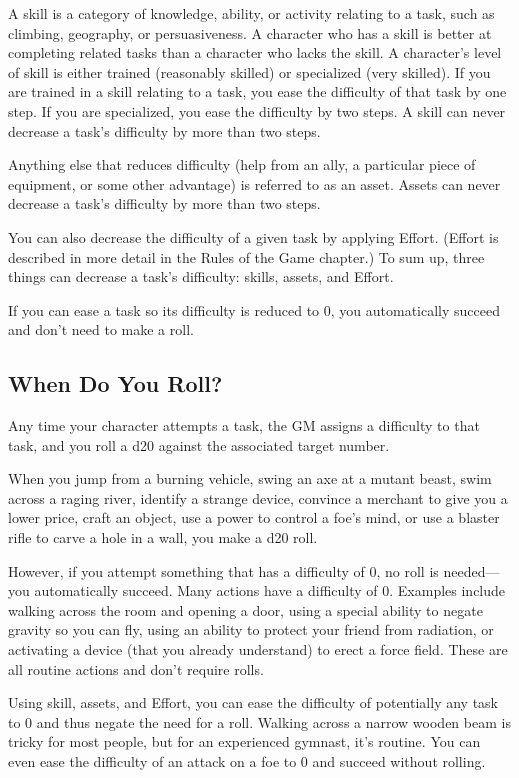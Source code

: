 \begin{multicols}{2}
A skill is a category of knowledge, ability, or activity relating to a task, such as climbing, geography, or persuasiveness. A character who has a skill is better at completing related tasks than a character who lacks the skill. A character’s level of skill is either trained (reasonably skilled) or specialized (very skilled).
If you are trained in a skill relating to a task, you ease the difficulty of that task by one step. If you are specialized, you ease the difficulty by two steps. A skill can never decrease a task’s difficulty by more than two steps.

Anything else that reduces difficulty (help from an ally, a particular piece of equipment, or some other advantage) is referred to as an asset. Assets can never decrease a task’s difficulty by more than two steps.

You can also decrease the difficulty of a given task by applying Effort. (Effort is described in more detail in the Rules of the Game chapter.) 
To sum up, three things can decrease a task’s difficulty: skills, assets, and Effort.

If you can ease a task so its difficulty is reduced to 0, you automatically succeed and don’t need to make a roll.

\subsection{When Do You Roll?} 

Any time your character attempts a task, the GM assigns a difficulty to that task, and you roll a d20 against the associated target number.

When you jump from a burning vehicle, swing an axe at a mutant beast, swim across a raging river, identify a strange device, convince a merchant to give you a lower price, craft an object, use a power to control a foe’s mind, or use a blaster rifle to carve a hole in a wall, you make a d20 roll.

However, if you attempt something that has a difficulty of 0, no roll is needed—you automatically succeed. Many actions have a difficulty of 0. Examples include walking across the room and opening a door, using a special ability to negate gravity so you can fly, using an ability to protect your friend from radiation, or activating a device (that you already understand) to erect a force field. These are all routine actions and don’t require rolls.

Using skill, assets, and Effort, you can ease the difficulty of potentially any task to 0 and thus negate the need for a roll. Walking across a narrow wooden beam is tricky for most people, but for an experienced gymnast, it’s routine. You can even ease the difficulty of an attack on a foe to 0 and succeed without rolling.


\end{multicols}
